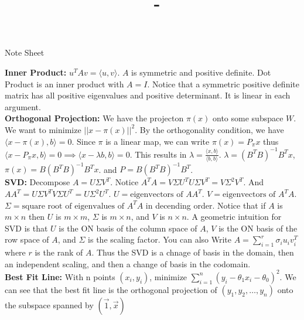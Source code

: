 \documentclass[answers,12pt,addpoints]{exam}
\author{\name}
\title{\course \ - \assignment}
\begin{document}
\begin{center}
    Note Sheet
\end{center}

\textbf{Inner Product:} $u^T A v = \langle u, v \rangle$. $A$ is symmetric and positive definite. Dot Product is an inner product with $A = I$. Notice that a symmetric positive definite matrix has all positive eigenvalues and positive determinant. It is linear in each argument. \\

\textbf{Orthogonal Projection:} We have the projecton $\pi(x)$ onto some subspace $W$. We want to minimize $||x - \pi(x)||^2$. By the orthogonality condition, we have $\langle x - \pi(x), b \rangle = 0$. Since $\pi$ is a linear map, we can write $\pi(x) = P_{\pi}x$ thus $\langle x - P_{\pi}x, b \rangle = 0 \implies \langle x - \lambda b, b \rangle = 0$. This results in $\lambda = \frac{\langle x, b \rangle}{\langle b, b \rangle}$. $\lambda = (B^T B)^{-1}B^T x$, $\pi(x) = B(B^T B)^{-1}B^T x$. and $P = B(B^T B)^{-1}B^T$.\\

\textbf{SVD:} Decompose $A = U\Sigma V^T$. Notice $A^TA = V\Sigma U^T U \Sigma V^T = V\Sigma^2V^T$. And $AA^T = U\Sigma V^T V \Sigma U^T = U \Sigma^2 U^T$. $U = \text{eigenvectors of } AA^T$. $V = \text{eigenvectors of } A^TA$. $\Sigma = \text{square root of eigenvalues of } A^TA$ in decending order. Notice that if $A$ is $m \times n$ then $U$ is $m \times m$, $\Sigma$ is $m \times n$, and $V$ is $n \times n$. A geometric intuition for SVD is that $U$ is the ON basis of the column space of $A$, $V$ is the ON basis of the row space of $A$, and $\Sigma$ is the scaling factor. You can also Write $A = \sum_{i=1}^r \sigma_i u_i v_i^T$ where $r$ is the rank of $A$. Thus the SVD is a chnage of basis in the domain, then an independent scaling, and then a change of basis in the codomain.\\

\textbf{Best Fit Line:} With n points $(x_i, y_i)$, minimize $\sum_{i=1}^n (y_i - \theta_1 x_i - \theta_0)^2$. We can see that the best fit line is the orthogonal projection of $(y_1, y_2, \ldots, y_n)$ onto the subspace spanned by $(\vec{1}, \vec{x})$
\end{document}
